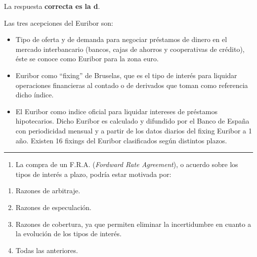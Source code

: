 \documentclass[
  letterpaper,
  DIV=11,
  numbers=noendperiod]{scrreprt}
\providecommand{\tightlist}{%
  \setlength{\itemsep}{0pt}\setlength{\parskip}{0pt}}\usepackage{longtable,booktabs,array}
\begin{document}
\begin{tcolorbox}[enhanced jigsaw, left=2mm, opacityback=0, colback=white, breakable, arc=.35mm, bottomrule=.15mm, rightrule=.15mm, toprule=.15mm, leftrule=.75mm, colframe=quarto-callout-tip-color-frame]
\begin{minipage}[t]{5.5mm}
\textcolor{quarto-callout-tip-color}{\faLightbulb}
\end{minipage}%
\begin{minipage}[t]{\textwidth - 5.5mm}

La respuesta \textbf{correcta es la d}.

Las tres acepciones del Euribor son:

\begin{itemize}
\item
  Tipo de oferta y de demanda para negociar préstamos de dinero en el
  mercado interbancario (bancos, cajas de ahorros y cooperativas de
  crédito), éste se conoce como Euribor para la zona euro.
\item
  Euribor como ``fixing'' de Bruselas, que es el tipo de interés para
  liquidar operaciones financieras al contado o de derivados que toman
  como referencia dicho índice.
\item
  El Euribor como indice oficial para liquidar intereses de préstamos
  hipotecarios. Dicho Euribor es calculado y difundido por el Banco de
  España con periodicidad mensual y a partir de los datos diarios del
  fixing Euribor a 1 año. Existen 16 fixings del Euribor clasificados
  según distintos plazos.
\end{itemize}

\end{minipage}%
\end{tcolorbox}

\begin{center}\rule{0.5\linewidth}{0.5pt}\end{center}

\begin{enumerate}
\def\labelenumi{\arabic{enumi}.}
\setcounter{enumi}{45}
\tightlist
\item
  La compra de un F.R.A. (\emph{Fordward Rate Agreement}), o acuerdo
  sobre los tipos de interés a plazo, podría estar motivada por:
\end{enumerate}

\begin{enumerate}
\def\labelenumi{\alph{enumi}.}
\item
  Razones de arbitraje.
\item
  Razones de especulación.
\item
  Razones de cobertura, ya que permiten eliminar la incertidumbre en
  cuanto a la evolución de los tipos de interés.
\item
  Todas las anteriores.
\end{enumerate}
\end{document}
